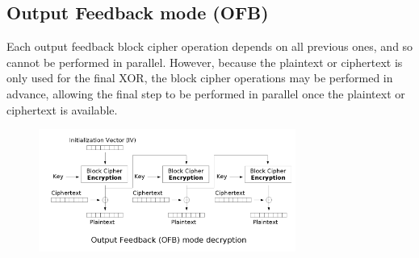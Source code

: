 \subsection{Output Feedback mode (OFB)}
Each output feedback block cipher operation depends on all previous ones, and so cannot be performed in parallel. However, because the plaintext or ciphertext is only used for the final XOR, the block cipher operations may be performed in advance, allowing the final step to be performed in parallel once the plaintext or ciphertext is available.
\begin{figure}[h]
    \centering
    \includegraphics[width=0.75\textwidth]{img/OFB.png}
\end{figure}


